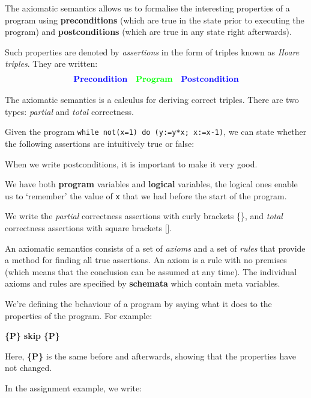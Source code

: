 \documentclass[11pt,a4paper,headsepline,titlepage,dvipsnames,cmyk]{scrartcl}
\begin{document}
The axiomatic semantics allows us to formalise the interesting properties
of a program using \textbf{preconditions} (which are true in the state
prior to executing the program) and \textbf{postconditions} (which are
true in any state right afterwards).

Such properties are denoted by \textit{assertions} in the form of triples
known as \textit{Hoare triples}. They are written:
\begin{align*}
    {\color{blue} \textbf{Precondition}} \quad {\color{green}
    \textbf{Program}} \quad {\color{blue} \textbf{Postcondition}}
\end{align*}

The axiomatic semantics is a calculus for deriving correct triples. There
are two types: \textit{partial} and \textit{total} correctness.

Given the program \lstinline|while not(x=1) do (y:=y*x; x:=x-1)|, we can
state whether the following assertions are intuitively true or false:


When we write postconditions, it is important to make it very good.

We have both \textbf{program} variables and \textbf{logical} variables,
the logical ones enable us to `remember' the value of \lstinline|x| that
we had before the start of the program.

We write the \textit{partial} correctness assertions with curly brackets
\{\}, and \textit{total} correctness assertions with square brackets [].

An axiomatic semantics consists of a set of \textit{axioms} and a set of
\textit{rules} that provide a method for finding all true assertions. An
axiom is a rule with no premises (which means that the conclusion can be
assumed at any time). The individual axioms and rules are specified by
\textbf{schemata} which contain meta variables.

We're defining the behaviour of a program by saying what it does to the
properties of the program. For example:

\begin{center}
    {\color{blue}\textbf{\{P\}}} {\color{green}\textbf{skip}}
    {\color{blue}\textbf{\{P\}}}
\end{center}

Here, {\color{blue}\textbf{\{P\}}} is the same before and afterwards,
showing that the properties have not changed.

In the assignment example, we write:
\end{document}
